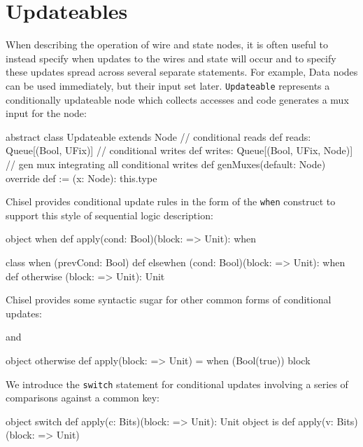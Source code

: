 \documentclass[10pt,twocolumn]{article}
\def\code#1{{\small\tt #1}}
\begin{document}
\section{Updateables}

\label{sec:wires}

When describing the operation of wire and state
nodes, it is often useful to instead specify when updates to the
wires and state will occur and to specify these updates spread across
several separate statements.  
For example, Data nodes can be used immediately, but their input set later.
\code{Updateable} represents a conditionally updateable node which
collects accesses and code generates a mux input for the node:

\begin{scala}
abstract class Updateable extends Node {
  // conditional reads
  def reads: Queue[(Bool, UFix)]
  // conditional writes
  def writes: Queue[(Bool, UFix, Node)]
  // gen mux integrating all conditional writes
  def genMuxes(default: Node)
  override def := (x: Node): this.type
}
\end{scala}

Chisel provides conditional update rules
in the form of the \code{when} construct to support this style of
sequential logic description:
 
\begin{scala}
object when {
  def apply(cond: Bool)(block: => Unit): when
}

class when (prevCond: Bool) {
  def elsewhen (cond: Bool)(block: => Unit): when
  def otherwise (block: => Unit): Unit
}
\end{scala}


Chisel provides some syntactic sugar for other common forms of
conditional updates:

\begin{scala}
object unless {
  def apply(c: Bool)(block: => Unit) = 
    when (!c) { block )
}
\end{scala}

\noindent 
and

\begin{scala}
object otherwise {
  def apply(block: => Unit) = 
    when (Bool(true)) { block }
}
\end{scala}

We introduce the \code{switch} statement for conditional updates
involving a series of comparisons against a common key:

\begin{scala}
object switch {
  def apply(c: Bits)(block: => Unit): Unit
}
object is {
  def apply(v: Bits)(block: => Unit)
}
\end{scala}
\end{document}
